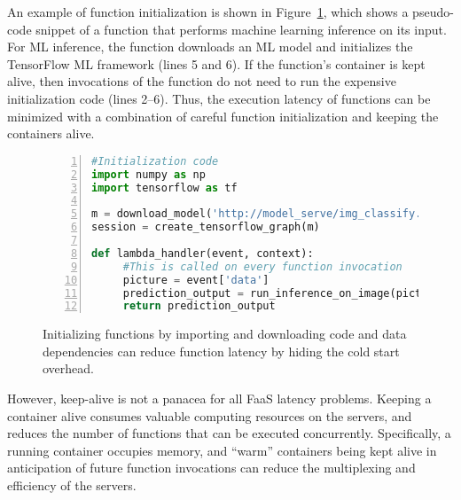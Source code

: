An example of function initialization is shown in Figure~\ref{fig:lambda-example}, which shows a pseudo-code snippet of a function that performs machine learning inference on its input. 
For ML inference, the function downloads an ML model and initializes the TensorFlow ML framework (lines  5 and 6). 
If the function's container is kept alive, then invocations of the function do not need to run the expensive initialization code (lines 2--6). 
Thus, the execution latency of functions can be minimized with a combination of careful function  initialization and keeping the containers alive. 


\begin{figure}
\begin{lstlisting}[language=Python, numbers=left, frame=single, basicstyle=\small, columns=fullflexible]
#Initialization code 
import numpy as np 
import tensorflow as tf
  
m = download_model('http://model_serve/img_classify.pb')
session = create_tensorflow_graph(m) 
  
def lambda_handler(event, context):
     #This is called on every function invocation 
     picture = event['data']
     prediction_output = run_inference_on_image(picture) 
     return prediction_output 
   \end{lstlisting}
   \vspace*{\myfigspace}
   \caption{Initializing functions by importing and downloading code and data dependencies can reduce function latency by hiding the cold start overhead.}
   \label{fig:lambda-example}
   \vspace*{\myfigspace}
\end{figure}


However, keep-alive is not a panacea for all FaaS latency problems. 
Keeping a container alive consumes valuable computing resources on the servers, and reduces the number of functions that can be executed concurrently. 
Specifically, a running container occupies memory, and ``warm'' containers being kept alive in anticipation of future function invocations can reduce the multiplexing and efficiency of the servers.

